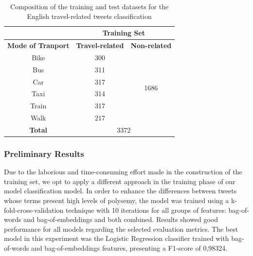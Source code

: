 \begin{table}[!tp]
	\centering
	\caption[English-speaking tweets datasets]{Composition of the training and test datasets for the English travel-related tweets classification}
	\label{tab:new_york_first_dataset}
	\begin{tabular}{c|c|c|}
		\cline{2-3}
		\textbf{}                                       & \multicolumn{2}{c|}{\textbf{Training Set}}                          \\ \hline
		\multicolumn{1}{|c|}{\textbf{Mode of Tranport}} & \textbf{Travel-related} & \multicolumn{1}{l|}{\textbf{Non-related}} \\ \hline
		\multicolumn{1}{|c|}{Bike}                      & 300                     & \multirow{6}{*}{1686}                     \\
		\multicolumn{1}{|c|}{Bus}                       & 311                     &                                           \\
		\multicolumn{1}{|c|}{Car}                       & 317                     &                                           \\
		\multicolumn{1}{|c|}{Taxi}                      & 314                     &                                           \\
		\multicolumn{1}{|c|}{Train}                     & 317                     &                                           \\
		\multicolumn{1}{|c|}{Walk}                      & 217                     &                                           \\ \hline
		\multicolumn{1}{|c|}{\textbf{Total}}            & \multicolumn{2}{c|}{3372}                                           \\ \hline
	\end{tabular}
\end{table}

\subsubsection{Preliminary Results}\label{subsec:preliminar_results}
Due to the laborious and time-consuming effort made in the construction of the training set, we opt to apply a different approach in the training phase of our model classification model. In order to enhance the differences between tweets whose terms present high levels of polysemy, the model was trained using a \gls{k-fold-cross-validation} technique with 10 iterations for all groups of features: bag-of-words and bag-of-embeddings and both combined. Results showed good performance for all models regarding the selected evaluation metrics. The best model in this experiment was the Logistic Regression classifier trained with bag-of-words and bag-of-embeddings features, presenting a F1-score of 0,98324.

